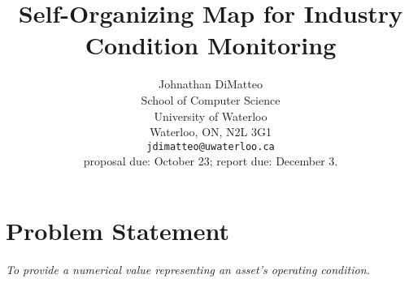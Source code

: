 \documentclass{article}
\title{Self-Organizing Map for Industry Condition Monitoring}
\author{
        Johnathan DiMatteo \\
        School of Computer Science\\
        University of Waterloo\\
        Waterloo, ON, N2L 3G1 \\
        \texttt{jdimatteo@uwaterloo.ca} \\
        {\color{red} proposal due: October 23; report due: December 3.}
    }
\begin{document}
    \maketitle
    
    \begin{abstract} 
    
    \end{abstract} 
    
    \section*{Problem Statement}
    \begin{center} 
        \textit{
    To provide a numerical value representing an asset's operating condition.
        }
    \end{center}
    
     
       
    

    \newpage

    \nocite{*}
    
    
    

    
    
\end{document}
